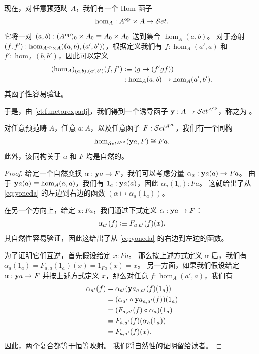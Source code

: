 现在，对任意预范畴 $A$，我们有一个 Hom 函子
%
\[\hom_A : A^{\mathrm{op}} \times A \to \mathcal{S}et.\]
它将一对 $(a,b): (A^{\mathrm{op}})_0 \times A_0 \equiv A_0 \times A_0$ 送到集合 $\hom_A(a,b)$。
对于态射 $(f,f') : \hom_{A^{\mathrm{op}}\times A}((a,b),(a',b'))$，根据定义我们有 $f:\hom_A(a',a)$ 和 $f':\hom_A(b,b')$，因此可以定义
\begin{align*}
  (\hom_A)_{(a,b),(a',b')}(f,f')
  &\vcentcolon\equiv (g \mapsto (f'gf))\\
  &: \hom_A(a,b) \to \hom_A(a',b').
\end{align*}
其函子性容易验证。

于是，由 \cref{ct:functorexpadj}，我们得到一个诱导函子 $\mathbf{y}:A\to \mathcal{S}et^{A^{\mathrm{op}}}$，称之为 。
%
%

\begin{thm}[米田引理]\label{ct:yoneda}
  对任意预范畴 $A$，任意 $a:A$，以及任意函子 $F:\mathcal{S}et^{A^{\mathrm{op}}}$，我们有一个同构
  \begin{equation}\label{eq:yoneda}
    \hom_{\mathcal{S}et^{A^{\mathrm{op}}}}(\mathbf{y} a, F) \cong Fa.
  \end{equation}
  此外，该同构关于 $a$ 和 $F$ 均是自然的。
\end{thm}

\begin{proof}
  给定一个自然变换 $\alpha:\mathbf{y} a \to F$，我们可以考虑分量 $\alpha_a : \mathbf{y} a(a) \to F a$。
  由于 $\mathbf{y} a(a)\equiv \hom_A(a,a)$，我们有 $1_a : \mathbf{y} a(a)$，因此 $\alpha_a(1_a) : F a$。
  这就给出了从 \eqref{eq:yoneda} 的左边到右边的函数 $(\alpha \mapsto \alpha_a(1_a))$。

  在另一个方向上，给定 $x:F a$，我们通过下式定义 $\alpha:\mathbf{y} a \to F$：
  \[\alpha_{a'}(f) \vcentcolon\equiv F_{a,a'}(f)(x). \]
  其自然性容易验证，因此这给出了从 \eqref{eq:yoneda} 的右边到左边的函数。

  为了证明它们互逆，首先假设给定 $x:F a$。
  那么按上述方式定义 $\alpha$ 后，我们有 $\alpha_a(1_a) = F_{a,a}(1_a)(x) = 1_{F a}(x) = x$。
  另一方面，如果我们假设给定 $\alpha:\mathbf{y} a \to F$ 并按上述方式定义 $x$，那么对任意 $f:\hom_A(a',a)$，我们有
  \begin{align*}
    \alpha_{a'}(f)
    &= \alpha_{a'} (\mathbf{y} a_{a,a'}(f)(1_a))\\
    &= (\alpha_{a'}\circ \mathbf{y} a_{a,a'}(f))(1_a)\\
    &= (F_{a,a'}(f)\circ \alpha_a)(1_a)\\
    &= F_{a,a'}(f)(\alpha_a(1_a))\\
    &= F_{a,a'}(f)(x).
  \end{align*}
  因此，两个复合都等于恒等映射。
  我们将自然性的证明留给读者。
\end{proof}

